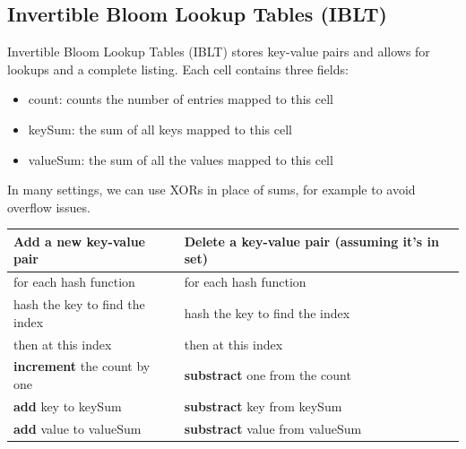 \documentclass[11pt,oneside,a4paper]{article}
\begin{document}
\newpage

\subsection{Invertible Bloom Lookup Tables (IBLT)}

Invertible Bloom Lookup Tables (IBLT) stores key-value pairs and allows for lookups and a complete listing. Each cell contains three fields:

\vspace{-\topsep}
\begin{itemize}
	\setlength{\itemsep}{0pt}
	\setlength{\parskip}{0pt}
	\item count: counts the number of entries mapped to this cell
	\item keySum: the sum of all keys mapped to this cell
	\item valueSum: the sum of all the values mapped to this cell
\end{itemize}
\vspace{-\topsep}

\noindent In many settings, we can use XORs in place of sums, for example to avoid overflow issues.

\begin{center}
	\begin{tabular}{ |p{75mm}|p{75mm}| } 
		\hline
		Add a new key-value pair & Delete a key-value pair (assuming it's in set) \\ 
		\hline
		for each hash function & for each hash function\\
		\hspace{3mm} hash the key to find the index & \hspace{3mm} hash the key to find the index \\
		\hspace{3mm} then at this index & \hspace{3mm} then at this index \\
		\hspace{6mm} \textbf{increment} the count by one & \hspace{6mm} \textbf{substract} one from the count \\
		\hspace{6mm} \textbf{add} key to keySum & \hspace{6mm} \textbf{substract} key from keySum \\
		\hspace{6mm} \textbf{add} value to valueSum & \hspace{6mm} \textbf{substract} value from valueSum \\
		\hline
	\end{tabular}
\end{center}
\end{document}
